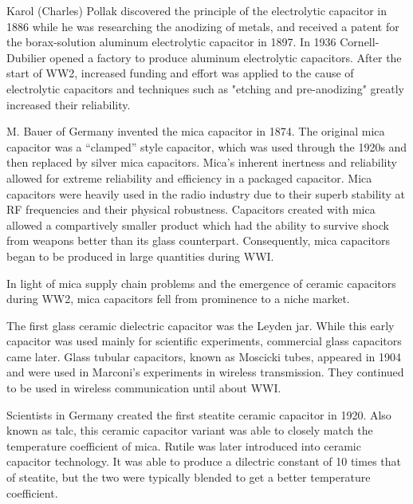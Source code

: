Karol (Charles) Pollak discovered the principle of the electrolytic capacitor in 1886 while he was researching the anodizing of metals, and received a patent for the borax-solution aluminum electrolytic capacitor in 1897.  
In 1936 Cornell-Dubilier opened a factory to produce aluminum electrolytic capacitors. 
After the start of WW2, increased funding and effort was applied to the cause of electrolytic capacitors and techniques such as "etching and pre-anodizing" greatly increased their reliability.\cite{deis_hist}\cite{wiki_elec}

\nocite{hh}
\nocite{capGuide_mica}
M. Bauer of Germany invented the mica capacitor in 1874. The original mica capacitor was a ``clamped'' style capacitor, which was used through the 1920s\cite{wiki_mica} and then replaced by silver mica capacitors.\cite{learn_caps}
Mica's inherent inertness and reliability allowed for extreme reliability and efficiency in a packaged capacitor.\cite{tedds_mica} Mica capacitors were heavily used in the radio industry due to their superb stability at RF frequencies and their physical robustness.\cite{radio_mica}
Capacitors created with mica allowed a compartively smaller product\cite[f.~37-41]{dumInv} which had the ability to survive shock from weapons better than its glass counterpart. Consequently, mica capacitors began to be produced in large quantities during WWI.

In light of mica supply chain problems and the emergence of ceramic capacitors during WW2, mica capacitors fell from prominence to a niche market.\cite[Ch 3, Sec II]{cerMaterials}

The first glass ceramic dielectric capacitor was the Leyden jar. While this early capacitor was used mainly for scientific experiments, commercial glass capacitors came later. 
Glass tubular capacitors, known as Moscicki tubes, appeared in 1904 and were used in Marconi's experiments in wireless transmission. They continued to be used in wireless communication until about WWI. \cite[p.~102]{dumInv}

Scientists in Germany created the first steatite ceramic capacitor in 1920. \cite[Ch 3 Sec II]{cerMaterials} \cite{cerDie} Also known as talc, this ceramic capacitor variant was able to closely match the temperature coefficient of mica.\cite{steatite_hf} Rutile was later introduced into ceramic capacitor technology. It was able to produce a dilectric constant of 10 times that of steatite, but the two were typically blended to get a better temperature coefficient. 

